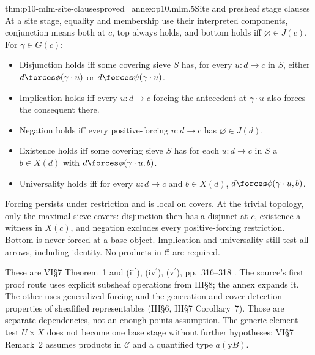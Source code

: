 \begin{hbtheorem}{thm:p10-mlm-site-clauses}{proved=annex:p10.mlm.5}{Site and presheaf stage clauses}
At a site stage, equality and membership use their interpreted components,
conjunction means both at \(c\), top always holds, and bottom holds iff
\(\varnothing\in J(c)\). For \(\gamma\in G(c)\):
\begin{itemize}
\item Disjunction holds iff some covering sieve \(S\) has, for every
      \(u:d\to c\) in \(S\), either \(d\forces\phi(\gamma\cdot u)\) or
      \(d\forces\psi(\gamma\cdot u)\).
\item Implication holds iff every \(u:d\to c\) forcing the antecedent at
      \(\gamma\cdot u\) also forces the consequent there.
\item Negation holds iff every positive-forcing \(u:d\to c\) has
      \(\varnothing\in J(d)\).
\item Existence holds iff some covering sieve \(S\) has for each \(u:d\to c\)
      in \(S\) a \(b\in X(d)\) with \(d\forces\phi(\gamma\cdot u,b)\).
\item Universality holds iff for every \(u:d\to c\) and \(b\in X(d)\),
      \(d\forces\phi(\gamma\cdot u,b)\).
\end{itemize}
Forcing persists under restriction and is local on covers. At the trivial
topology, only the maximal sieve covers: disjunction then has a disjunct at
\(c\), existence a witness in \(X(c)\), and negation excludes every
positive-forcing restriction. Bottom is never forced at a base object.
Implication and universality still test all arrows, including identity.
No products in \(\mathcal C\) are required.
\end{hbtheorem}

These are VI\S7 Theorem~1 and (ii\(^{\prime}\)), (iv\(^{\prime}\)),
(v\(^{\prime}\)), pp.~316--318 \cite{MacLaneMoerdijk1992}.
The source's first proof route uses explicit subsheaf operations from III\S8;
the annex expands it. The other uses generalized forcing and the generation
and cover-detection properties of sheafified representables (III\S6,
III\S7 Corollary~7). Those are separate dependencies, not an enough-points
assumption. The generic-element test \(U\times X\) does not become one base
stage without further hypotheses; VI\S7 Remark~2 assumes products in
\(\mathcal C\) and a quantified type \(a(\mathrm yB)\).

